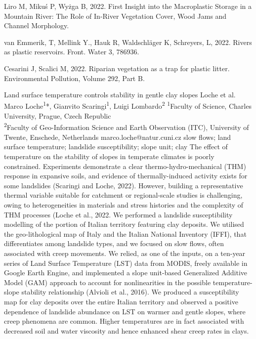 {Liro M, Mikuś P, Wyżga B, 2022. First Insight into the Macroplastic Storage in a Mountain River: The Role of In-River Vegetation Cover, Wood Jams and Channel Morphology. 

van Emmerik, T, Mellink Y., Hauk R, Waldschläger K, Schreyers, L, 2022. Rivers as plastic reservoirs. Front. Water 3, 786936. 

Cesarini J, Scalici M, 2022. Riparian vegetation as a trap for plastic litter. Environmental Pollution, Volume 292, Part B. 
}

\abstract
{Land surface temperature controls stability in gentle clay slopes} 
{Loche et al.} 
{Marco Loche\textsuperscript{1}*, Gianvito Scaringi\textsuperscript{1}, Luigi Lombardo\textsuperscript{2}} 
{\TLtag} 
{
\textsuperscript{1}Faculty of Science, Charles University, Prague, Czech Republic\\
\textsuperscript{2}Faculty of Geo-Information Science and Earth Observation (ITC), University of Twente, Enschede, Netherlands
}
{marco.loche@natur.cuni.cz}  %
{slow flows; land surface temperature; landslide susceptibility; slope unit; clay}
{The effect of temperature on the stability of slopes in temperate climates is poorly constrained. Experiments demonstrate a clear thermo-hydro-mechanical (THM) response in expansive soils, and evidence of thermally-induced activity exists for some landslides (Scaringi and Loche, 2022). However, building a representative thermal variable suitable for catchment or regional-scale studies is challenging, owing to heterogeneities in materials and stress histories and the complexity of THM processes (Loche et al., 2022. We performed a landslide susceptibility modelling of the portion of Italian territory featuring clay deposits. We utilised the geo-lithological map of Italy and the Italian National Inventory (IFFI), that differentiates among landslide types, and we focused on slow flows, often associated with creep movements. We relied, as one of the inputs, on a ten-year series of Land Surface Temperature (LST) data from MODIS, freely available in Google Earth Engine, and implemented a slope unit-based Generalized Additive Model (GAM) approach to account for nonlinearities in the possible temperature-slope stability relationship (Alvioli et al., 2016). We produced a susceptibility map for clay deposits over the entire Italian territory and observed a positive dependence of landslide abundance on LST on warmer and gentle slopes, where creep phenomena are common. Higher temperatures are in fact associated with decreased soil and water viscosity and hence enhanced shear creep rates in clays.
}
